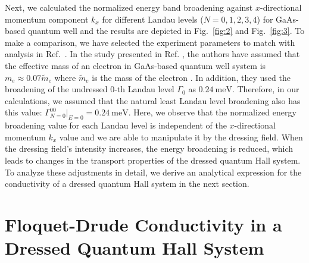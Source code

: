 \documentclass[
 reprint,
 amsmath,amssymb,
 aps,
 prb,
]{revtex4-2}
\begin{document}
Next, we calculated the normalized energy band broadening against $x$-directional momentum component ${k_x}$ for different Landau levels ($N = 0,1,2,3,4$) for GaAs-based quantum well and the results are depicted in Fig.~\ref{fig:2} and Fig.~\ref{fig:3}. To make a comparison, we have selected the experiment parameters to match with analysis in Ref.~\cite{endo09}.
{\color{Red}In the study presented in Ref. \cite{endo09}, the authors have assumed that the effective mass of an electron in GaAs-based quantum well system is $m_e \approx 0.07\widetilde{m}_e$ where $\widetilde{m}_e$ is the mass of the electron \cite{endo09,winkler03,wackerl20}.} In addition, they used the broadening of the undressed $0$-th Landau level $\Gamma_0$ as $\SI{0.24}{\milli\eV}$. Therefore, in our calculations, we assumed that the natural least Landau level broadening also has this value: $\Gamma^{00}_{N=0}|_{E=0} = \SI{0.24}{\milli\eV}$.
Here, we observe that the normalized energy broadening value for each Landau level is independent of the $x$-directional momentum $k_x$ value and we are able to manipulate it by the dressing field. When the dressing field's intensity increases, the energy broadening is reduced, which leads to changes in the transport properties of the dressed quantum Hall system.
To analyze these adjustments in detail, we derive an analytical expression for the conductivity of a dressed quantum Hall system in the next section.

\section{\label{sec:floquet_drude_conductivity} Floquet-Drude Conductivity in a Dressed Quantum Hall System}
\end{document}
